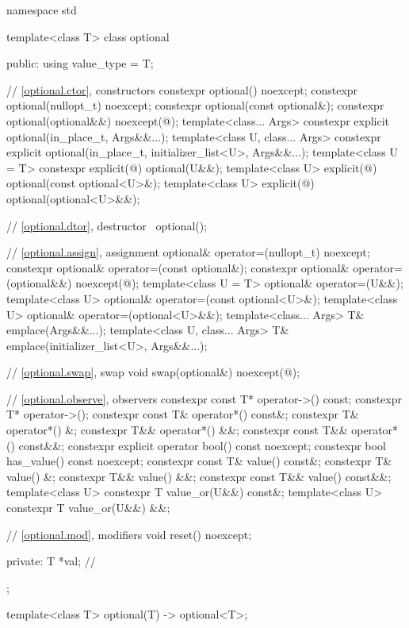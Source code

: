 %
%
\begin{codeblock}
namespace std {
  template<class T>
  class optional {
  public:
    using value_type = T;

    // \ref{optional.ctor}, constructors
    constexpr optional() noexcept;
    constexpr optional(nullopt_t) noexcept;
    constexpr optional(const optional&);
    constexpr optional(optional&&) noexcept(@\seebelow@);
    template<class... Args>
      constexpr explicit optional(in_place_t, Args&&...);
    template<class U, class... Args>
      constexpr explicit optional(in_place_t, initializer_list<U>, Args&&...);
    template<class U = T>
      constexpr explicit(@\seebelow@) optional(U&&);
    template<class U>
      explicit(@\seebelow@) optional(const optional<U>&);
    template<class U>
      explicit(@\seebelow@) optional(optional<U>&&);

    // \ref{optional.dtor}, destructor
    ~optional();

    // \ref{optional.assign}, assignment
    optional& operator=(nullopt_t) noexcept;
    constexpr optional& operator=(const optional&);
    constexpr optional& operator=(optional&&) noexcept(@\seebelow@);
    template<class U = T> optional& operator=(U&&);
    template<class U> optional& operator=(const optional<U>&);
    template<class U> optional& operator=(optional<U>&&);
    template<class... Args> T& emplace(Args&&...);
    template<class U, class... Args> T& emplace(initializer_list<U>, Args&&...);

    // \ref{optional.swap}, swap
    void swap(optional&) noexcept(@\seebelow@);

    // \ref{optional.observe}, observers
    constexpr const T* operator->() const;
    constexpr T* operator->();
    constexpr const T& operator*() const&;
    constexpr T& operator*() &;
    constexpr T&& operator*() &&;
    constexpr const T&& operator*() const&&;
    constexpr explicit operator bool() const noexcept;
    constexpr bool has_value() const noexcept;
    constexpr const T& value() const&;
    constexpr T& value() &;
    constexpr T&& value() &&;
    constexpr const T&& value() const&&;
    template<class U> constexpr T value_or(U&&) const&;
    template<class U> constexpr T value_or(U&&) &&;

    // \ref{optional.mod}, modifiers
    void reset() noexcept;

  private:
    T *val;         // \expos
  };

  template<class T>
    optional(T) -> optional<T>;
}
\end{codeblock}

